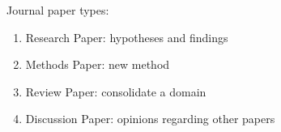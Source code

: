 \documentclass[
]{book}
\providecommand{\tightlist}{%
  \setlength{\itemsep}{0pt}\setlength{\parskip}{0pt}}
\begin{document}
Journal paper types:

\begin{enumerate}
\def\labelenumi{\arabic{enumi}.}
\tightlist
\item
  Research Paper: hypotheses and findings
\item
  Methods Paper: new method
\item
  Review Paper: consolidate a domain
\item
  Discussion Paper: opinions regarding other papers
\end{enumerate}

  
\end{document}
